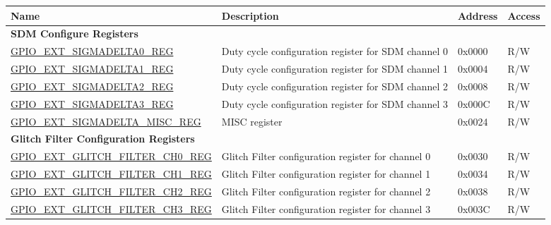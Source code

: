 \begin{longtable}{ | p{6.2cm} | p{7.2cm} | p{1.3cm} | p{1cm} | }
\hline\rowcolor{lightgray}
\textbf{Name} & \textbf{Description} & \textbf{Address} & \textbf{Access} \\ \hline
\endhead
\multicolumn{4}{|l|}{\textbf{SDM Configure Registers}} \\ \hline

\hyperref[regdesc:GPIOSDSIGMADELTANREG]{GPIO\_EXT\_SIGMADELTA0\_REG} & Duty cycle configuration register for SDM channel 0 & 0x0000 & R/W \\ \hline

\hyperref[regdesc:GPIOSDSIGMADELTANREG]{GPIO\_EXT\_SIGMADELTA1\_REG} & Duty cycle configuration register for SDM channel 1 & 0x0004 & R/W \\ \hline

\hyperref[regdesc:GPIOSDSIGMADELTANREG]{GPIO\_EXT\_SIGMADELTA2\_REG} & Duty cycle configuration register for SDM channel 2 & 0x0008 & R/W \\ \hline

\hyperref[regdesc:GPIOSDSIGMADELTANREG]{GPIO\_EXT\_SIGMADELTA3\_REG} & Duty cycle configuration register for SDM channel 3 & 0x000C & R/W \\ \hline

\hyperref[regdesc:GPIOSDSIGMADELTAMISCREG]{GPIO\_EXT\_SIGMADELTA\_MISC\_REG} & MISC register & 0x0024 & R/W \\ \hline

\multicolumn{4}{|l|}{\textbf{Glitch Filter Configuration Registers}} \\ \hline

\hyperref[regdesc:GPIOSDGLITCHFILTERCHNREG]{GPIO\_EXT\_GLITCH\_FILTER\_CH0\_REG} & Glitch Filter configuration register for channel 0 & 0x0030 & R/W \\ \hline

\hyperref[regdesc:GPIOSDGLITCHFILTERCHNREG]{GPIO\_EXT\_GLITCH\_FILTER\_CH1\_REG} & Glitch Filter configuration register for channel 1 & 0x0034 & R/W \\ \hline

\hyperref[regdesc:GPIOSDGLITCHFILTERCHNREG]{GPIO\_EXT\_GLITCH\_FILTER\_CH2\_REG} & Glitch Filter configuration register for channel 2 & 0x0038 & R/W \\ \hline

\hyperref[regdesc:GPIOSDGLITCHFILTERCHNREG]{GPIO\_EXT\_GLITCH\_FILTER\_CH3\_REG} & Glitch Filter configuration register for channel 3 & 0x003C & R/W \\ \hline


\end{longtable}
